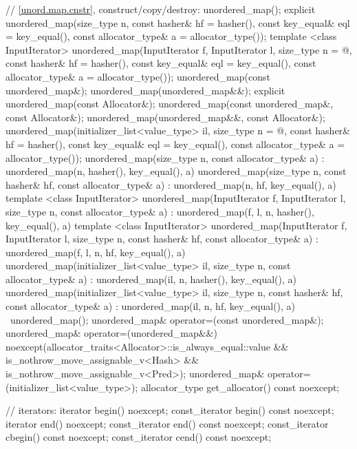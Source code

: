 \begin{codeblock}
{{    // \ref{unord.map.cnstr}, construct/copy/destroy:
    unordered_map();
    explicit unordered_map(size_type n,
                           const hasher& hf = hasher(),
                           const key_equal& eql = key_equal(),
                           const allocator_type& a = allocator_type());
    template <class InputIterator>
      unordered_map(InputIterator f, InputIterator l,
                    size_type n = @\seebelow@,
                    const hasher& hf = hasher(),
                    const key_equal& eql = key_equal(),
                    const allocator_type& a = allocator_type());
    unordered_map(const unordered_map&);
    unordered_map(unordered_map&&);
    explicit unordered_map(const Allocator&);
    unordered_map(const unordered_map&, const Allocator&);
    unordered_map(unordered_map&&, const Allocator&);
    unordered_map(initializer_list<value_type> il,
                  size_type n = @\seebelow@,
                  const hasher& hf = hasher(),
                  const key_equal& eql = key_equal(),
                  const allocator_type& a = allocator_type());
    unordered_map(size_type n, const allocator_type& a)
      : unordered_map(n, hasher(), key_equal(), a) { }
    unordered_map(size_type n, const hasher& hf, const allocator_type& a)
      : unordered_map(n, hf, key_equal(), a) { }
    template <class InputIterator>
      unordered_map(InputIterator f, InputIterator l, size_type n, const allocator_type& a)
        : unordered_map(f, l, n, hasher(), key_equal(), a) { }
    template <class InputIterator>
      unordered_map(InputIterator f, InputIterator l, size_type n, const hasher& hf,
                    const allocator_type& a)
        : unordered_map(f, l, n, hf, key_equal(), a) { }
    unordered_map(initializer_list<value_type> il, size_type n, const allocator_type& a)
      : unordered_map(il, n, hasher(), key_equal(), a) { }
    unordered_map(initializer_list<value_type> il, size_type n, const hasher& hf,
                  const allocator_type& a)
      : unordered_map(il, n, hf, key_equal(), a) { }
    ~unordered_map();
    unordered_map& operator=(const unordered_map&);
    unordered_map& operator=(unordered_map&&)
      noexcept(allocator_traits<Allocator>::is_always_equal::value &&
               is_nothrow_move_assignable_v<Hash> &&
               is_nothrow_move_assignable_v<Pred>);
    unordered_map& operator=(initializer_list<value_type>);
    allocator_type get_allocator() const noexcept;

    // iterators:
    iterator       begin() noexcept;
    const_iterator begin() const noexcept;
    iterator       end() noexcept;
    const_iterator end() const noexcept;
    const_iterator cbegin() const noexcept;
    const_iterator cend() const noexcept;

}}
\end{codeblock}
